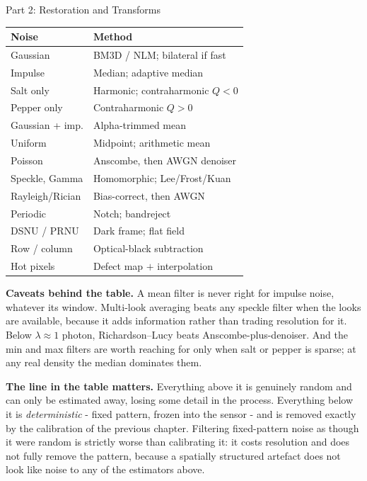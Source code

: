 \documentclass[letterpaper]{article}
\begin{document}
\begin{notes}{Part 2: Restoration and Transforms}
\begin{center}
\begin{tabular}{@{}ll@{}}
\toprule
Noise & Method \\
\midrule
Gaussian        & BM3D / NLM; bilateral if fast \\
Impulse         & Median; adaptive median \\
Salt only       & Harmonic; contraharmonic $Q{<}0$ \\
Pepper only     & Contraharmonic $Q{>}0$ \\
Gaussian + imp. & Alpha-trimmed mean \\
Uniform         & Midpoint; arithmetic mean \\
Poisson         & Anscombe, then AWGN denoiser \\
Speckle, Gamma  & Homomorphic; Lee/Frost/Kuan \\
Rayleigh/Rician & Bias-correct, then AWGN \\
Periodic        & Notch; bandreject \\
\midrule
DSNU / PRNU     & Dark frame; flat field \\
Row / column    & Optical-black subtraction \\
Hot pixels      & Defect map $+$ interpolation \\
\bottomrule
\end{tabular}
\end{center}

\textbf{Caveats behind the table.} A mean filter is never right for impulse noise, whatever its window. Multi-look averaging beats any speckle filter when the looks are available, because it adds information rather than trading resolution for it. Below $\lambda\approx1$ photon, Richardson--Lucy beats Anscombe-plus-denoiser. And the min and max filters are worth reaching for only when salt or pepper is sparse; at any real density the median dominates them.

\textbf{The line in the table matters.} Everything above it is genuinely random and can only be estimated away, losing some detail in the process. Everything below it is \emph{deterministic} - fixed pattern, frozen into the sensor - and is removed exactly by the calibration of the previous chapter. Filtering fixed-pattern noise as though it were random is strictly worse than calibrating it: it costs resolution and does not fully remove the pattern, because a spatially structured artefact does not look like noise to any of the estimators above.

\columnbreaknofill


\end{notes}
\end{document}
